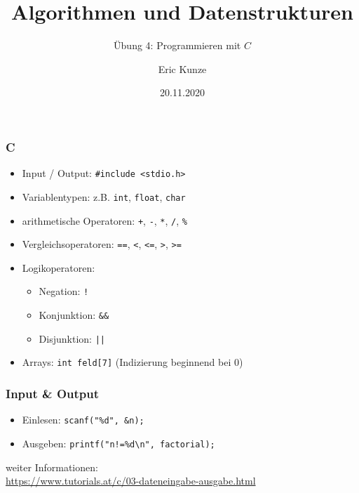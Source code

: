 \documentclass{beamer}
\begin{document}
	
	\title{Algorithmen und Datenstrukturen}
	\subtitle{Übung 4: Programmieren mit $C$}
	\author{Eric Kunze}
	\date{20.11.2020}

	\maketitle



\begin{frame}[fragile] \frametitle{C}
	\begin{itemize}
		\item Input / Output: \lstinline{#include <stdio.h>}
		\item Variablentypen: z.B. \lstinline{int}, \lstinline{float}, \lstinline{char}
		\item arithmetische Operatoren: \lstinline{+}, \lstinline{-},  \lstinline{*}, \lstinline{/}, \lstinline{%}
		\item Vergleichsoperatoren: \lstinline{==}, \lstinline{<}, \lstinline{<=}, \lstinline{>}, \lstinline{>=}
		\item Logikoperatoren: 
		\begin{itemize}
			\item Negation: \lstinline{!} 
			\item Konjunktion: \lstinline{&&} 
			\item Disjunktion: \lstinline{||}
		\end{itemize}
		\item Arrays: \lstinline{int feld[7]} (Indizierung beginnend bei 0)
	\end{itemize}
\end{frame}

\begin{frame}[fragile] \frametitle{Input \& Output}
	\begin{itemize}
		\item Einlesen: \lstinline{scanf("%d", &n);}
		\item Ausgeben: \lstinline{printf("n!=%d\n", factorial);}
	\end{itemize}

	weiter Informationen: \\
	\url{https://www.tutorials.at/c/03-dateneingabe-ausgabe.html}
			
			
\end{frame}
\end{document}
